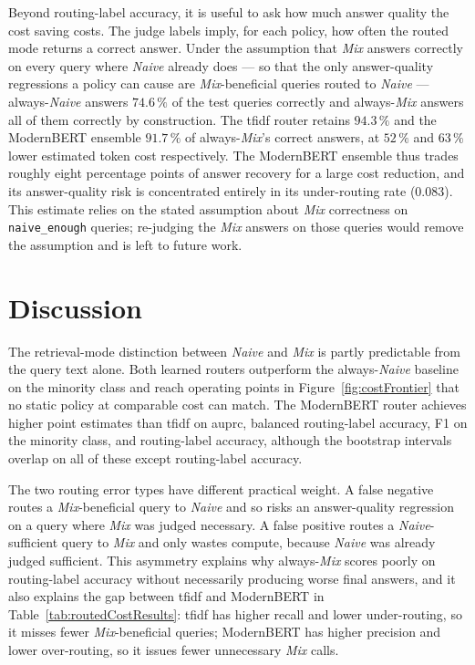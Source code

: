 \documentclass[english, bibtex]{kththesis}               %
\numberwithin{listing}{chapter}
\begin{document}
Beyond routing-label accuracy, it is useful to ask how much answer quality the cost saving costs. The judge labels imply, for each policy, how often the routed mode returns a correct answer. Under the assumption that \emph{Mix} answers correctly on every query where \emph{Naive} already does --- so that the only answer-quality regressions a policy can cause are \emph{Mix}-beneficial queries routed to \emph{Naive} --- always-\emph{Naive} answers $74.6\,\%$ of the test queries correctly and always-\emph{Mix} answers all of them correctly by construction. The \gls{tfidf} router retains $94.3\,\%$ and the ModernBERT ensemble $91.7\,\%$ of always-\emph{Mix}'s correct answers, at $52\,\%$ and $63\,\%$ lower estimated token cost respectively. The ModernBERT ensemble thus trades roughly eight percentage points of answer recovery for a large cost reduction, and its answer-quality risk is concentrated entirely in its under-routing rate ($0.083$). This estimate relies on the stated assumption about \emph{Mix} correctness on \texttt{naive\_enough} queries; re-judging the \emph{Mix} answers on those queries would remove the assumption and is left to future work.

\section{Discussion}
\label{sec:implDiscussion}

The retrieval-mode distinction between \emph{Naive} and \emph{Mix} is partly predictable from the query text alone. Both learned routers outperform the always-\emph{Naive} baseline on the minority class and reach operating points in Figure~\ref{fig:costFrontier} that no static policy at comparable cost can match. The ModernBERT router achieves higher point estimates than \gls{tfidf} on \gls{auprc}, balanced routing-label accuracy, F1 on the minority class, and routing-label accuracy, although the bootstrap intervals overlap on all of these except routing-label accuracy.

The two routing error types have different practical weight. A false negative routes a \emph{Mix}-beneficial query to \emph{Naive} and so risks an answer-quality regression on a query where \emph{Mix} was judged necessary. A false positive routes a \emph{Naive}-sufficient query to \emph{Mix} and only wastes compute, because \emph{Naive} was already judged sufficient. This asymmetry explains why always-\emph{Mix} scores poorly on routing-label accuracy without necessarily producing worse final answers, and it also explains the gap between \gls{tfidf} and ModernBERT in Table~\ref{tab:routedCostResults}: \gls{tfidf} has higher recall and lower under-routing, so it misses fewer \emph{Mix}-beneficial queries; ModernBERT has higher precision and lower over-routing, so it issues fewer unnecessary \emph{Mix} calls.
\end{document}
